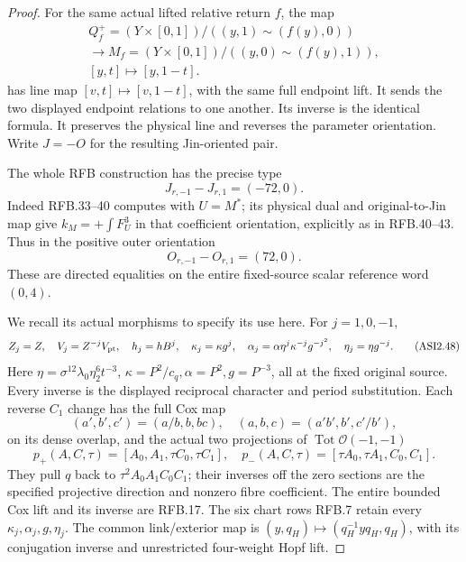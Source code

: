 \begin{proof}
For the same actual lifted relative return \(f\),
the map
\[
 \begin{gathered}
 Q_f^+=(Y\times[0,1])/((y,1)\sim(f(y),0))\\
 \longrightarrow M_f=(Y\times[0,1])/((y,0)\sim(f(y),1)),\\
 [y,t]\longmapsto[y,1-t].
 \end{gathered}
 \tag{ASI2.45}
\]
has line map \([v,t]\mapsto[v,1-t]\), with the same
full endpoint lift. It sends the two displayed
endpoint relations to one another. Its inverse
is the identical formula. It preserves the
physical line and reverses the parameter
orientation. Write \(J=-O\) for the resulting
Jin-oriented pair.

The whole RFB construction has the precise type
\[
                    J_{r,-1}-J_{r,1}=(-72,0).
 \tag{ASI2.46}
\]
Indeed RFB.33--40 computes with \(U=M^*\);
its physical dual and original-to-Jin map give
\(k_M=+\int F_U^3\) in that coefficient
orientation, explicitly as in RFB.40--43.
Thus in the positive outer orientation
\[
                    O_{r,-1}-O_{r,1}=(72,0).
 \tag{ASI2.47}
\]
These are directed equalities on the entire
fixed-source scalar reference word \((0,4)\).

We recall its actual morphisms to specify its
use here. For \(j=1,0,-1\),
\[
 Z_j=Z,\quad V_j=Z^{-j}V_{\rm pt},\quad h_j=hB^j,\quad
 \kappa_j=\kappa g^j,\quad
 \alpha_j=\alpha\eta^j\kappa^{-j}g^{-j^2},\quad
 \eta_j=\eta g^{-j}.
 \tag{ASI2.48}
\]
Here \(\eta=\sigma^{12}\lambda_0\eta_2^6t^{-3}\),
\(\kappa=P^2/c_q,\alpha=P^2,g=P^{-3}\), all at
the fixed original source. Every inverse is
the displayed reciprocal character and period
substitution. Each reverse \(C_1\) change has
the full Cox map
\[
 (a',b',c')=(a/b,b,bc),\quad
 (a,b,c)=(a'b',b',c'/b'),
 \tag{ASI2.49}
\]
on its dense overlap, and the actual two
projections of \(\operatorname{Tot}\mathcal O(-1,-1)\)
\[
 p_+(A,C,\tau)=[A_0,A_1,\tau C_0,\tau C_1],\quad
 p_-(A,C,\tau)=[\tau A_0,\tau A_1,C_0,C_1].
 \tag{ASI2.50}
\]
They pull \(q\) back to
\(\tau^2A_0A_1C_0C_1\); their inverses off the
zero sections are the specified projective
direction and nonzero fibre coefficient.
The entire bounded Cox lift and its inverse
are RFB.17. The six chart rows RFB.7 retain
every \(\kappa_j,\alpha_j,g,\eta_j\).
The common link/exterior map is
\((y,q_H)\mapsto(q_H^{-1}yq_H,q_H)\), with
its conjugation inverse and unrestricted
four-weight Hopf lift.


\end{proof}
